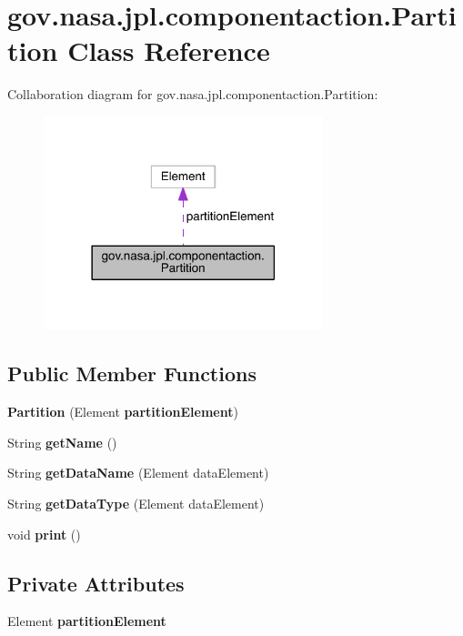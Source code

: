 \section{gov.\+nasa.\+jpl.\+componentaction.\+Partition Class Reference}
\label{classgov_1_1nasa_1_1jpl_1_1componentaction_1_1_partition}


Collaboration diagram for gov.\+nasa.\+jpl.\+componentaction.\+Partition\+:
\nopagebreak
\begin{figure}[H]
\begin{center}
\leavevmode
\includegraphics[width=230pt]{classgov_1_1nasa_1_1jpl_1_1componentaction_1_1_partition__coll__graph}
\end{center}
\end{figure}
\subsection*{Public Member Functions}
\begin{DoxyCompactItemize}
\item 
{\bf Partition} (Element {\bf partition\+Element})
\item 
String {\bf get\+Name} ()
\item 
String {\bf get\+Data\+Name} (Element data\+Element)
\item 
String {\bf get\+Data\+Type} (Element data\+Element)
\item 
void {\bf print} ()
\end{DoxyCompactItemize}
\subsection*{Private Attributes}
\begin{DoxyCompactItemize}
\item 
Element {\bf partition\+Element}
\end{DoxyCompactItemize}


